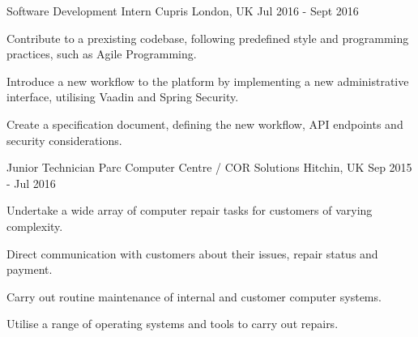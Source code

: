 

\begin{cventries}

  \cventry
    {Software Development Intern} %
    {Cupris} %
    {London, UK} %
    {Jul 2016 - Sept 2016} %
    {
      \begin{cvitems} %
        \item {Contribute to a prexisting codebase, following predefined style and programming practices, such as Agile Programming.}
        \item {Introduce a new workflow to the platform by implementing a new administrative interface, utilising Vaadin and Spring Security.}
        \item {Create a specification document, defining the new workflow, API endpoints and security considerations.}
      \end{cvitems}
    }

  \cventry
    {Junior Technician} %
    {Parc Computer Centre / COR Solutions} %
    {Hitchin, UK} %
    {Sep 2015 - Jul 2016} %
    {
      \begin{cvitems} %
        \item {Undertake a wide array of computer repair tasks for customers of varying complexity.}
        \item {Direct communication with customers about their issues, repair status and payment.}
        \item {Carry out routine maintenance of internal and customer computer systems.}
	\item {Utilise a range of operating systems and tools to carry out repairs.}
      \end{cvitems}
    }
\end{cventries}
